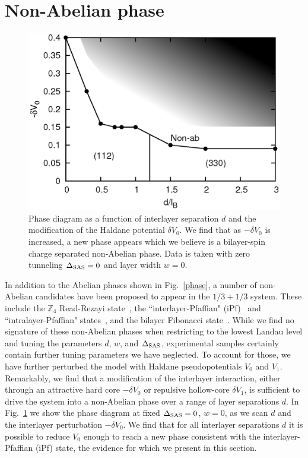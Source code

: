 
\section{Non-Abelian phase}
\label{sec:nonabelian}

\begin{figure}%
	\includegraphics[width=0.6\linewidth]{figures/V0phase.eps}
	\caption{Phase diagram as a function of interlayer separation $d$ and the modification of the Haldane potential $\delta V_0$. We find that as $-\delta V_0$ is increased, a new phase appears which we believe is a bilayer-spin charge separated non-Abelian phase. Data is taken with zero tunneling $\Delta_\textrm{SAS} = 0$ and layer width $w=0$.}
	\label{V0phase}
\end{figure}

In addition to the Abelian phases shown in Fig.~\ref{phase}, a number of non-Abelian candidates have been proposed to appear in the $1/3+1/3$ system.
These include the $\mathbb{Z}_4$ Read-Rezayi state~\cite{Read-PhysRevB.59.8084}, the ``interlayer-Pfaffian" (iPf)~\cite{Ardonne02} and ``intralayer-Pfaffian" states~\cite{Barkeshli10}, and the bilayer Fibonacci state~\cite{Vaezi14}.
While we find no signature of these non-Abelian phases when restricting to the lowest Landau level and tuning the parameters $d$, $w$, and $\Delta_\textrm{SAS}$, experimental samples certainly contain further tuning parameters we have neglected.
To account for those, we have further perturbed the model with Haldane pseudopotentials $V_0$ and $V_1$.
Remarkably, we find that a modification of the interlayer interaction, either through an attractive hard core $-\delta V_0$ or repulsive hollow-core $\delta V_1$, is sufficient to drive the system into a non-Abelian phase over a range of layer separations $d$. 
In Fig.~\ref{V0phase} we show the phase diagram at fixed $\Delta_\textrm{SAS} = 0$, $w = 0$, as we scan $d$ and the interlayer perturbation $-\delta V_0$.
We find that for all interlayer separations $d$ it is possible to reduce $V_0$ enough to reach a new phase consistent with the interlayer-Pfaffian (iPf) state, the evidence for which we present in this section.

